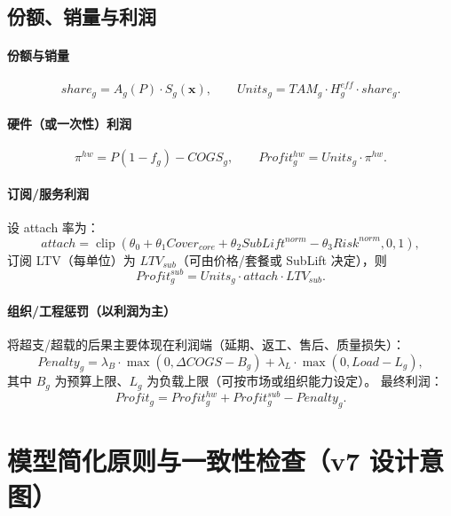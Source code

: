 \documentclass[UTF8,12pt]{ctexart}
\newcommand{\clip}{\operatorname{clip}}
\begin{document}
\subsection{份额、销量与利润}
\paragraph{份额与销量}
\begin{equation}
share_g = A_g(P)\cdot S_g(\mathbf{x}),\qquad
Units_g = TAM_g\cdot H^{eff}_g\cdot share_g.
\end{equation}

\paragraph{硬件（或一次性）利润}
\begin{equation}
\pi^{hw} = P(1-f_g)-COGS_g,\qquad
Profit^{hw}_g = Units_g\cdot \pi^{hw}.
\end{equation}

\paragraph{订阅/服务利润}
设 attach 率为：
\begin{equation}
attach = \clip(\theta_0+\theta_1 Cover_{core}+\theta_2 SubLift^{norm}-\theta_3 Risk^{norm},0,1),
\end{equation}
订阅 LTV（每单位）为 $LTV_{sub}$（可由价格/套餐或 SubLift 决定），则
\begin{equation}
Profit^{sub}_g = Units_g\cdot attach \cdot LTV_{sub}.
\end{equation}

\paragraph{组织/工程惩罚（以利润为主）}
将超支/超载的后果主要体现在利润端（延期、返工、售后、质量损失）：
\begin{equation}
Penalty_g = \lambda_B\cdot \max(0,\Delta COGS - B_g) + \lambda_L\cdot \max(0,Load-L_g),
\label{eq:penalty_profit}
\end{equation}
其中 $B_g$ 为预算上限、$L_g$ 为负载上限（可按市场或组织能力设定）。
最终利润：
\begin{equation}
Profit_g = Profit^{hw}_g + Profit^{sub}_g - Penalty_g.
\end{equation}

\section{模型简化原则与一致性检查（v7 设计意图）}
\end{document}
